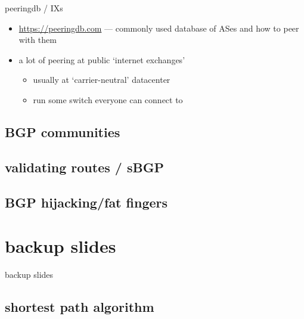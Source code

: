\begin{frame}{peeringdb / IXs}
    \begin{itemize}
    \item \url{https://peeringdb.com} --- commonly used database of ASes and how to peer with them
    \item a lot of peering at public `internet exchanges'
        \begin{itemize}
        \item usually at `carrier-neutral' datacenter
        \item run some switch everyone can connect to
        \end{itemize}
    \end{itemize}
\end{frame}

\subsection{BGP communities}


\subsection{validating routes / sBGP}


\subsection{BGP hijacking/fat fingers}




\section{backup slides}
\begin{frame}{backup slides}
\end{frame}

\subsection{shortest path algorithm}



